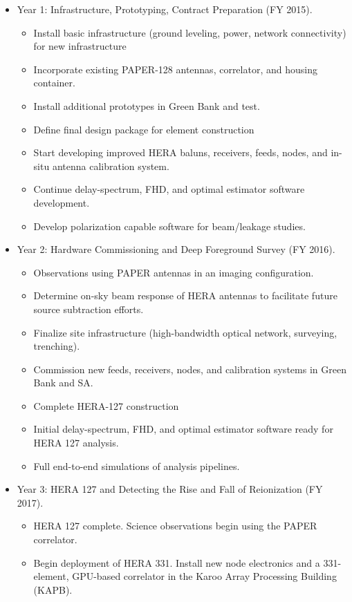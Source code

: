 \documentclass[preprint]{aastex}
\begin{document}
\begin{itemize}[itemsep=-4pt,parsep=-3pt]
\item Year 1:  Infrastructure, Prototyping, Contract Preparation (FY 2015).
\begin{itemize}[itemsep=-4pt]
\item Install basic infrastructure (ground leveling, power, network connectivity) for new infrastructure
\item Incorporate existing PAPER-128 antennas, correlator, and housing container. 
\item Install additional prototypes in Green Bank and test.
\item Define final design package for element construction
\item Start developing improved HERA baluns, receivers, feeds, nodes, and in-situ antenna calibration system. 
\item Continue delay-spectrum, FHD, and optimal estimator software development.
\item Develop polarization capable software for beam/leakage studies.
\end{itemize}
\item Year 2:  Hardware Commissioning and Deep Foreground Survey (FY 2016). 
\begin{itemize}[itemsep=-4pt]
\item Observations using PAPER antennas in an imaging configuration. 
\item Determine on-sky beam response of HERA antennas to facilitate future source subtraction efforts. 
\item Finalize site infrastructure (high-bandwidth optical network, surveying, trenching). 
\item Commission new feeds, receivers, nodes, and calibration systems in Green Bank and SA. 
\item Complete HERA-127 construction
\item Initial delay-spectrum, FHD, and optimal estimator software ready for HERA 127 analysis.
\item Full end-to-end simulations of analysis pipelines.
\end{itemize}
\item Year 3:  HERA 127 and Detecting the Rise and Fall of Reionization (FY 2017). 
\begin{itemize}[itemsep=-4pt]
\item HERA 127 complete. Science observations begin using the PAPER correlator. 
\item Begin deployment of HERA 331. Install new node electronics and a 331-element, GPU-based correlator in the Karoo Array Processing Building (KAPB). 

\end{itemize}
\end{itemize}
\end{document}
